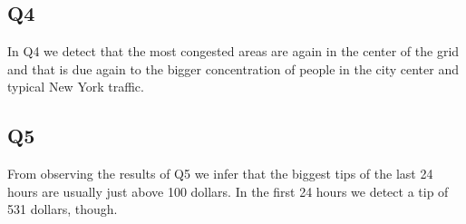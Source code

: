 \subsection{Q4}
In Q4 we detect that the most congested areas are again in the center of the grid and that is due again to the bigger concentration of people in the city center and typical New York traffic.

\subsection{Q5}
From observing the results of Q5 we infer that the biggest tips of the last 24 hours are usually just above 100 dollars. In the first 24 hours we detect a tip of 531 dollars, though.







